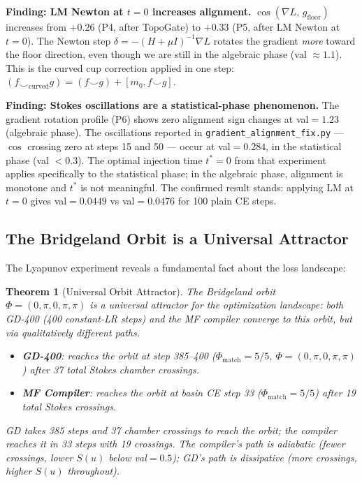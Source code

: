 \documentclass[11pt]{amsart}
\newtheorem{theorem}{Theorem}[section]
\begin{document}
\textbf{Finding: LM Newton at $t=0$ increases alignment.}
$\cos(\nabla L,\, g_\mathrm{floor})$ increases from $+0.26$ (P4, after TopoGate)
to $+0.33$ (P5, after LM Newton at $t=0$).
The Newton step $\delta = -(H+\mu I)^{-1}\nabla L$
rotates the gradient \emph{more} toward the floor direction,
even though we are still in the algebraic phase (val $\approx 1.1$).
This is the curved cup correction applied in one step:
$(f \smile_\mathrm{curved} g) = (f \smile g) + [m_0, f \smile g]$.

\textbf{Finding: Stokes oscillations are a statistical-phase phenomenon.}
The gradient rotation profile (P6) shows zero alignment sign changes
at val$= 1.23$ (algebraic phase).
The oscillations reported in \texttt{gradient\_alignment\_fix.py}
--- $\cos$ crossing zero at steps 15 and 50 --- occur at val$=0.284$,
in the statistical phase (val $< 0.3$).
The optimal injection time $t^*=0$ from that experiment
applies specifically to the statistical phase; in the algebraic phase,
alignment is monotone and $t^*$ is not meaningful.
The confirmed result stands: applying LM at $t=0$ gives
val$=0.0449$ vs val$=0.0476$ for 100 plain CE steps.

\subsection{The Bridgeland Orbit is a Universal Attractor}
\label{sec:orbit-attractor}

The Lyapunov experiment reveals
a fundamental fact about the loss landscape:

\begin{theorem}[Universal Orbit Attractor]
\label{thm:orbit}
The Bridgeland orbit $\Phi = (0,\pi,0,\pi,\pi)$
is a universal attractor for the optimization landscape:
both GD-400 (400 constant-LR steps) and the MF compiler
converge to this orbit, but via qualitatively different paths.

\begin{itemize}
\item \textbf{GD-400}: reaches the orbit at step 385--400
  ($\Phi_\mathrm{match}=5/5$, $\Phi=(0,\pi,0,\pi,\pi)$)
  after 37 total Stokes chamber crossings.
\item \textbf{MF Compiler}: reaches the orbit at basin CE step 33
  ($\Phi_\mathrm{match}=5/5$) after 19 total Stokes crossings.
\end{itemize}
GD takes 385 steps and 37 chamber crossings to reach the orbit;
the compiler reaches it in 33 steps with 19 crossings.
The compiler's path is adiabatic (fewer crossings, lower $S(u)$ below val$=0.5$);
GD's path is dissipative (more crossings, higher $S(u)$ throughout).
\end{theorem}
\end{document}
